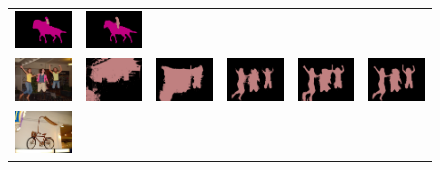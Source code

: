 \begin{figure}[p]
{\begin{tabular}{c c c c c c}
    \includegraphics[height=0.11\linewidth]{fig/val_crf_vis/strongweak/2007_003022.png} &
    \includegraphics[height=0.11\linewidth]{fig/val_crf_vis/cocomix/2007_003022.png} \\
    \includegraphics[height=0.123\linewidth]{fig/val_crf_vis/img/2008_003546.jpg} &
    \includegraphics[height=0.123\linewidth]{fig/val_crf_vis/adaweak/2008_003546.png} &
    \includegraphics[height=0.123\linewidth]{fig/val_crf_vis/bbox/2008_003546.png} &
    \includegraphics[height=0.123\linewidth]{fig/val_crf_vis/bbox_crf/2008_003546.png} &
    \includegraphics[height=0.123\linewidth]{fig/val_crf_vis/strongweak/2008_003546.png} &
    \includegraphics[height=0.123\linewidth]{fig/val_crf_vis/cocomix/2008_003546.png} \\
    \includegraphics[height=0.123\linewidth]{fig/val_crf_vis/img/2008_004363.jpg} &

\end{tabular}}
\end{figure}
